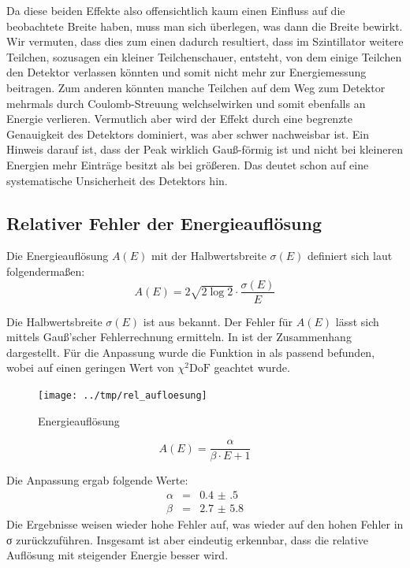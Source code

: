 Da diese beiden Effekte also offensichtlich kaum einen Einfluss auf die
beobachtete Breite haben, muss man sich überlegen, was dann die Breite bewirkt.
Wir vermuten, dass dies zum einen dadurch resultiert, dass im Szintillator
weitere Teilchen, sozusagen ein kleiner Teilchenschauer, entsteht, von dem
einige Teilchen den Detektor verlassen könnten und somit nicht mehr zur
Energiemessung beitragen. Zum anderen könnten manche Teilchen auf dem Weg zum
Detektor mehrmals durch Coulomb-Streuung welchselwirken und somit ebenfalls an
Energie verlieren. Vermutlich aber wird der Effekt durch eine begrenzte
Genauigkeit des Detektors dominiert, was aber schwer nachweisbar ist. Ein
Hinweis darauf ist, dass der Peak wirklich Gauß-förmig ist und nicht bei
kleineren Energien mehr Einträge besitzt als bei größeren. Das deutet schon auf
eine systematische Unsicherheit des Detektors hin.

\subsection{Relativer Fehler der Energieauflösung}

Die Energieauflösung $A(E)$ mit der Halbwertsbreite $σ(E)$
definiert sich laut \cite{script} folgendermaßen:
\begin{equation}
 A(E) = 2\sqrt{2\log{2}}\cdot\frac{σ(E)}{E}
 \label{eqn:energie_aufloesung}
\end{equation}

Die Halbwertsbreite $σ(E)$ ist aus  bekannt. Der Fehler
für $A(E)$ lässt sich mittels Gauß’scher Fehlerrechnung ermitteln. In
 ist der Zusammenhang dargestellt. Für die Anpassung
wurde die Funktion in  als passend befunden,
wobei auf einen geringen Wert von $\chi^2\mathrm{DoF}$ geachtet wurde.

\begin{figure}[htb]
      \centering
      \texttt{[image: ../tmp/rel\_aufloesung]}
      \caption{Energieauflösung}
      \label{fig:rel_aufloesung}
\end{figure}

\begin{equation}
 A(E) = \frac{\alpha}{\beta \cdot E + 1}
 \label{eqn:rel_aufloesung_anpassung}
\end{equation}

Die Anpassung ergab folgende Werte:
\begin{eqnarray}
 \alpha &=& \num{0.4(5)}  \\
 \beta &=& \num{2.7(58)}
\end{eqnarray}
Die Ergebnisse weisen wieder hohe Fehler auf, was wieder auf den hohen Fehler
in σ zurückzuführen. Insgesamt ist aber eindeutig erkennbar, dass die relative
Auflösung mit steigender Energie besser wird.

